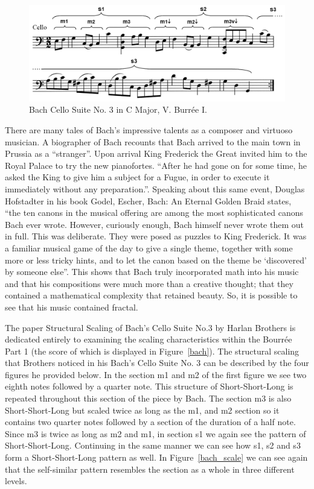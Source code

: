 \documentclass{article}
\begin{document}
\begin{figure}[ht!]
    \centering
    \includegraphics[width=\linewidth]{figures/bach_cello.png}
    \caption{%
        Bach Cello Suite No. 3 in C Major, V. Burrée I.
    }\label{fig:bach}
\end{figure}

There are many tales of Bach's impressive talents as a composer and virtuoso
musician. A biographer of Bach recounts that Bach arrived to the main  town in
Prussia as a “stranger”. Upon arrival King Frederick the Great invited him to
the Royal Palace to try the new pianofortes. ``After he had gone on for some
time, he asked the King to give him a subject for a Fugue, in order to execute
it immediately without any preparation.''\cite{6}. Speaking about this same event,
Douglas Hofstadter in his book Godel, Escher, Bach: An Eternal Golden Braid
states, ``the ten canons in the musical offering are among the most sophisticated
canons Bach ever wrote. However, curiously enough, Bach himself never wrote them
out in full. This was deliberate. They were posed as puzzles to King Frederick.
It was a familiar musical game of the day to give a single theme, together with
some more or less tricky hints, and to let the canon based on the theme be
`discovered' by someone else''\cite{7}. This shows that Bach truly incorporated math
into his music and that his compositions were much more than a creative thought;
that they contained a mathematical complexity that retained beauty. So, it is
possible to see that his music contained fractal.

The paper Structural Scaling of Bach’s Cello Suite No.3 by Harlan Brothers is
dedicated entirely to examining the scaling characteristics within the Bourrée
Part 1 (the score of which is displayed in Figure~\ref{bach}). The structural
scaling that Brothers noticed in his Bach’s Cello Suite No. 3 can be described
by the four figures he provided below. In the section m1 and m2 of the first
figure we see two eighth notes followed by a
quarter note. This structure of Short-Short-Long is repeated throughout this
section of the piece by Bach. The section m3 is also Short-Short-Long but scaled
twice as long as the m1, and m2 section so it contains two quarter notes
followed by a section of the duration of a half note. Since m3 is twice as long
as m2 and m1, in section s1 we again see the pattern of Short-Short-Long.
Continuing in the same manner we can see how s1, s2 and s3 form a
Short-Short-Long pattern as well. In Figure~\ref{bach_scale} we can see again 
that the self-similar pattern resembles the section as a whole in three
different levels. 
\end{document}
